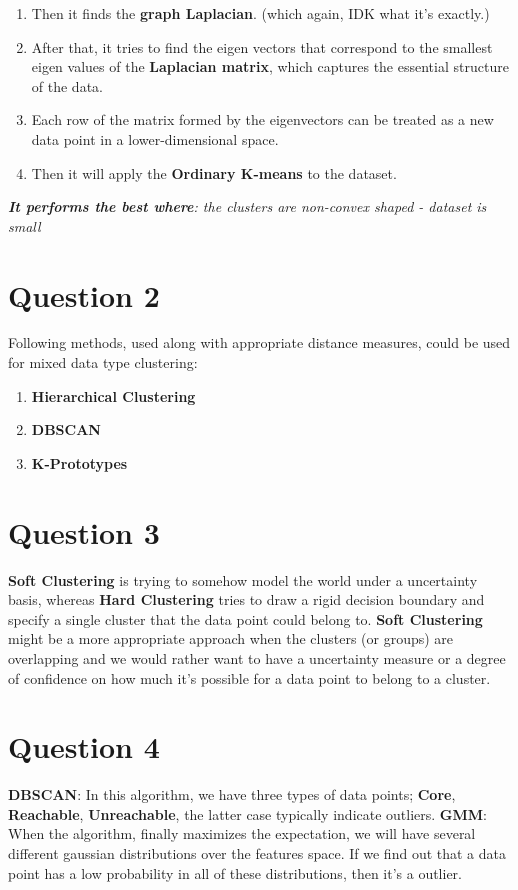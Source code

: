 \documentclass[a4paper,12pt]{article}
\begin{document}
\begin{itemize}
\begin{enumerate}
        \item Then it finds the \textbf{graph Laplacian}. (which again, IDK what it's exactly.)
        \item After that, it tries to find the eigen vectors that correspond to the smallest eigen values of the \textbf{Laplacian matrix}, which captures the essential structure of the data.
        \item Each row of the matrix formed by the eigenvectors can be treated as a new data point in a lower-dimensional space.   
        \item Then it will apply the \textbf{Ordinary K-means} to the dataset. 
    \end{enumerate}
    \textit{\textbf{It performs the best where}: the clusters are non-convex shaped - dataset is small}
\end{itemize}

\section*{Question 2}
Following methods, used along with appropriate distance measures, could be used for mixed data type clustering:
\begin{enumerate}
    \item \textbf{Hierarchical Clustering}
    \item \textbf{DBSCAN}
    \item \textbf{K-Prototypes}
\end{enumerate}

\section*{Question 3}
\textbf{Soft Clustering} is trying to somehow model the world under a uncertainty basis, whereas \textbf{Hard Clustering} tries to draw a rigid decision boundary and specify a single cluster that the data point could belong to.
\textbf{Soft Clustering} might be a more appropriate approach when the clusters (or groups) are overlapping and we would rather want to have a uncertainty measure or a degree of confidence on how much it's possible for a data point to belong to a cluster.  

\section*{Question 4}
\textbf{DBSCAN}: In this algorithm, we have three types of data points; \textbf{Core}, \textbf{Reachable}, \textbf{Unreachable}, the latter case typically indicate outliers.
\textbf{GMM}: When the algorithm, finally maximizes the expectation, we will have several different gaussian distributions over the features space. If we find out that a data point has a low probability in all of these distributions, then it's a outlier.
\end{document}
